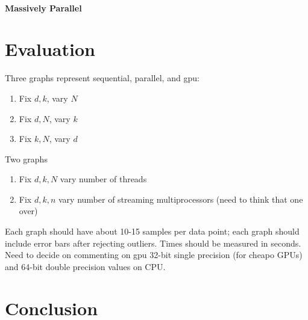 \documentclass{article}
\begin{document}
\paragraph{Massively Parallel}

\section{Evaluation}

Three graphs represent sequential, parallel, and gpu:

\begin{enumerate}
	\item Fix $d, k$, vary $N$
	\item Fix $d, N$, vary $k$
	\item Fix $k, N$, vary $d$
\end{enumerate}

Two graphs

\begin{enumerate}
	\item Fix $d, k, N$ vary number of threads
	\item Fix $d, k, n$ vary number of streaming multiprocessors (need to think that one over)
\end{enumerate}

Each graph should have about 10-15 samples per data point; each graph should include error bars after rejecting outliers. Times should be measured in seconds. Need to decide on commenting on gpu 32-bit single precision (for cheapo GPUs) and 64-bit double precision values on CPU.

\section{Conclusion}



\end{document}
